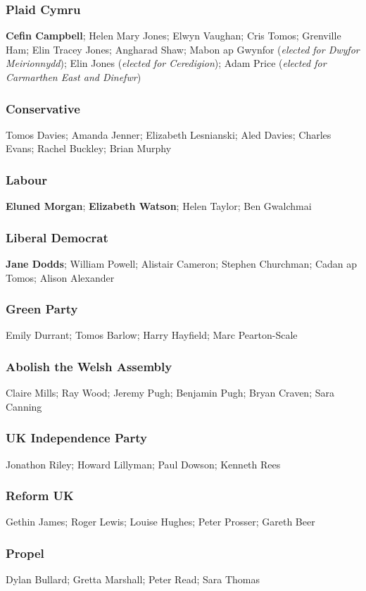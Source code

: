 \begin{resultsiii}
	\subsubsection*{Plaid Cymru}
	\textbf{Cefin Campbell}; Helen Mary Jones; Elwyn Vaughan; Cris Tomos; Grenville Ham; Elin Tracey Jones; Angharad Shaw; Mabon ap Gwynfor (\emph{elected for Dwyfor Meirionnydd}); Elin Jones (\emph{elected for Ceredigion}); Adam Price (\emph{elected for Carmarthen East and Dinefwr})
	\subsubsection*{Conservative}
	Tomos Davies; Amanda Jenner; Elizabeth Lesnianski; Aled Davies; Charles Evans; Rachel Buckley; Brian Murphy
	\subsubsection*{Labour}
	\textbf{Eluned Morgan}; \textbf{Elizabeth Watson}; Helen Taylor; Ben Gwalchmai
	\subsubsection*{Liberal Democrat}
	\textbf{Jane Dodds}; William Powell; Alistair Cameron; Stephen Churchman; Cadan ap Tomos; Alison Alexander
	\subsubsection*{Green Party}
	Emily Durrant; Tomos Barlow; Harry Hayfield; Marc Pearton-Scale
	\subsubsection*{Abolish the Welsh Assembly}
	Claire Mills; Ray Wood; Jeremy Pugh; Benjamin Pugh; Bryan Craven; Sara Canning
	\subsubsection*{UK Independence Party}
	Jonathon Riley; Howard Lillyman; Paul Dowson; Kenneth Rees
	\subsubsection*{Reform UK}
	Gethin James; Roger Lewis; Louise Hughes; Peter Prosser; Gareth Beer
	\subsubsection*{Propel}
	Dylan Bullard; Gretta Marshall; Peter Read; Sara Thomas

\end{resultsiii}

